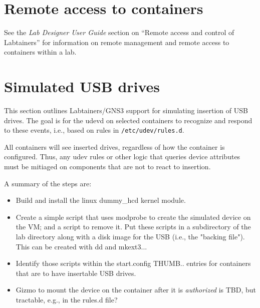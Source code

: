 \documentclass[12pt]{article}
\begin{document}
\section{Remote access to containers}
See the \textit{Lab Designer User Guide} section on ``Remote access and control of Labtainers'' for information 
on remote management and remote access to containers within a lab.

\section{Simulated USB drives}
This section outlines Labtainers/GNS3 support for simulating insertion of USB drives.  The goal is for the udevd on selected containers to
recognize and respond to these events, i.e., based on rules in {\tt /etc/udev/rules.d}.   

All containers will see inserted drives, regardless of how the container is configured.  Thus, any udev rules or other logic that queries
device attributes must be mitiaged on components that are not to react to insertion.  

A summary of the steps are:
\begin{itemize}
\item Build and install the linux dummy\_hcd kernel module.
\item Create a simple script that uses modprobe to create the simulated device on the VM; and a script to remove it.  Put these scripts in a 
subdirectory of the lab directory along with a disk image for the USB (i.e., the "backing file").  This can be created with  dd and mkext3...
\item Identify those scripts within the start.config THUMB.. entries for containers that are to have insertable USB drives.
\item Gizmo to mount the device on the container after it is \textit{authorized} is TBD, but tractable, e.g., in the rules.d file?
\end{itemize}
\end{document}
